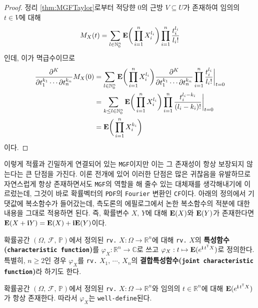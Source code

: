 \begin{proof}
    정리 \ref{thm:MGFTaylor}로부터 적당햔 $0$의 근방 $V\subseteq U$가 존재하여 임의의 $t\in V$에 대해
    \begin{equation*}
        M_X(t)=\sum_{l\in\mathbb{N}_0^n}\mathbf{E}\bigg(\prod_{i=1}^nX_i^{l_i}\bigg)\prod_{i=1}^n\frac{t_i^{l_i}}{l_i!}
    \end{equation*}
    인데, 이가 멱급수이므로
    \begin{align*}
        \frac{\partial^K}{\partial t_1^{k_1}\cdots\partial t_n^{k_n}}M_X(0)&=\sum_{l\in\mathbb{N}_0^n}\mathbf{E}\bigg(\prod_{i=1}^nX_i^{l_i}\bigg)\frac{\partial^K}{\partial t_1^{k_1}\cdots\partial t_n^{k_n}}\prod_{i=1}^n\frac{t_i^{l_i}}{l_i!}\bigg\vert_{t=0}\\
        &=\sum_{k\leq l\in\mathbb{N}_0^n}\mathbf{E}\bigg(\prod_{i=1}^nX_i^{l_i}\bigg)\prod_{i=1}^n\frac{t_i^{l_i-k_i}}{(l_i-k_i)!}\bigg\vert_{t=0}\\
        &=\mathbf{E}\bigg(\prod_{i=1}^nX_i^{k_i}\bigg)
    \end{align*}
    이다.
\end{proof}

이렇게 적률과 긴밀하게 연결되어 있는 \texttt{MGF}이지만 이는 그 존재성이 항상 보장되지 않는다는 큰 단점을 가진다. 이론 전개에 있어 이러한 단점은 많은 귀찮음을 유발하므로 자연스럽게 항상 존재하면서도 \texttt{MGF}의 역할을 해 줄수 있는 대체재를 생각해내기에 이르렀는데, 그것이 바로 확률벡터의 \texttt{PDF}의 \texttt{Fourier} 변환인 \texttt{CF}이다. 아래의 정의에서 기댓값에 복소함수가 들어갔는데, 측도론의 에필로그에서 논한 복소함수의 적분에 대한 내용을 그대로 적용하면 된다. 즉, 확률변수 $X,\,Y$에 대해 $\mathbf{E}(X)$와 $\mathbf{E}(Y)$가 존재한다면 $\mathbf{E}(X+\mathbf{i} Y)=\mathbf{E}(X)+\mathbf{i}\mathbf{E}(Y)$이다.

\begin{definition}
    확률공간 $(\Omega,\,\mathcal{F},\,\mathbb{P})$에서 정의된 \texttt{rv.} $X:\Omega\to\mathbb{R}^n$에 대해 \texttt{rv.} $X$의 \textbf{특성함수(\texttt{characteristic function})}를 $\varphi_X:\mathbb{R}^n\to\mathbb{C}$로 쓰고 $\varphi_X:t\mapsto\mathbf{E}(e^{\mathbf{i}\,t^{\mathsf{T}} X})$로 정의한다. 특별히, $n\geq2$인 경우 $\varphi_X$를 \texttt{rv.} $X_1,\,\cdots,\,X_n$의 \textbf{결합특성함수(\texttt{joint characteristic function})}라 하기도 한다.
\end{definition}

\begin{proposition}
    확률공간 $(\Omega,\,\mathcal{F},\,\mathbb{P})$에서 정의된 \texttt{rv.} $X:\Omega\to\mathbb{R}^n$와 임의의 $t\in\mathbb{R}^n$에 대해 $\mathbf{E}(e^{\mathbf{i}\,t^{\mathsf{T}} X})$가 항상 존재한다. 따라서 $\varphi_X$는 \texttt{well-define}된다.
\end{proposition}

